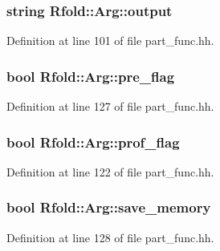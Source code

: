 \hypertarget{class_rfold_1_1_arg_a172c943d9eafc1bfc27fde48db831f5d}{
\subsubsection[{output}]{\setlength{\rightskip}{0pt plus 5cm}string Rfold\+::\+Arg\+::output}}\label{class_rfold_1_1_arg_a172c943d9eafc1bfc27fde48db831f5d}


Definition at line 101 of file part\+\_\+func.\+hh.

\hypertarget{class_rfold_1_1_arg_a8a7ca4df7e6085e8cc4af60917c99a92}{
\subsubsection[{pre\+\_\+flag}]{\setlength{\rightskip}{0pt plus 5cm}bool Rfold\+::\+Arg\+::pre\+\_\+flag}}\label{class_rfold_1_1_arg_a8a7ca4df7e6085e8cc4af60917c99a92}


Definition at line 127 of file part\+\_\+func.\+hh.

\hypertarget{class_rfold_1_1_arg_ada0e4aafdcedc01f9891d523f2626226}{
\subsubsection[{prof\+\_\+flag}]{\setlength{\rightskip}{0pt plus 5cm}bool Rfold\+::\+Arg\+::prof\+\_\+flag}}\label{class_rfold_1_1_arg_ada0e4aafdcedc01f9891d523f2626226}


Definition at line 122 of file part\+\_\+func.\+hh.

\hypertarget{class_rfold_1_1_arg_a4baebf9ebff2c466c56e5e377cccd360}{
\subsubsection[{save\+\_\+memory}]{\setlength{\rightskip}{0pt plus 5cm}bool Rfold\+::\+Arg\+::save\+\_\+memory}}\label{class_rfold_1_1_arg_a4baebf9ebff2c466c56e5e377cccd360}


Definition at line 128 of file part\+\_\+func.\+hh.

